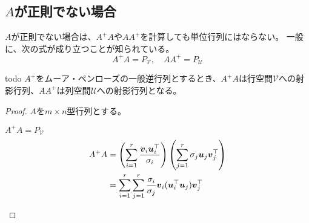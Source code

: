 \documentclass[../../../topic_linear-algebra]{subfiles}
\begin{document}
\subsection{$A$が正則でない場合}

$A$が正則でない場合は、$A^+A$や$AA^+$を計算しても単位行列にはならない。
一般に、次の式が成り立つことが知られている。
\begin{equation*}
  A^+ A = P_{\mathcal{V}}, \quad A A^+ = P_{\mathcal{U}}
\end{equation*}

\begin{theorem}{todo}
  $A^+$をムーア・ペンローズの一般逆行列とするとき、$A^+ A$は行空間$\mathcal{V}$への射影行列、$AA^+$は列空間$\mathcal{U}$への射影行列となる。
\end{theorem}

\begin{proof}
  \todo{}
  
  $A$を$m \times n$型行列とする。
  
  \begin{subpattern}{$A^+ A = P_{\mathcal{V}}$}
    \begin{align*}
      A^+ A & = \left( \sum_{i=1}^{r} \frac{\vb*{v}_i \vb*{u}_i^\top}{\sigma_i} \right) \left( \sum_{j=1}^{r} \sigma_j \vb*{u}_j \vb*{v}_j^\top \right) \\
            & = \sum_{i=1}^{r} \sum_{j=1}^{r} \frac{\sigma_i}{\sigma_j} \vb*{v}_i (\vb*{u}_i^\top \vb*{u}_j) \vb*{v}_j^\top \\
    \end{align*}
  \end{subpattern}
\end{proof}
\end{document}
